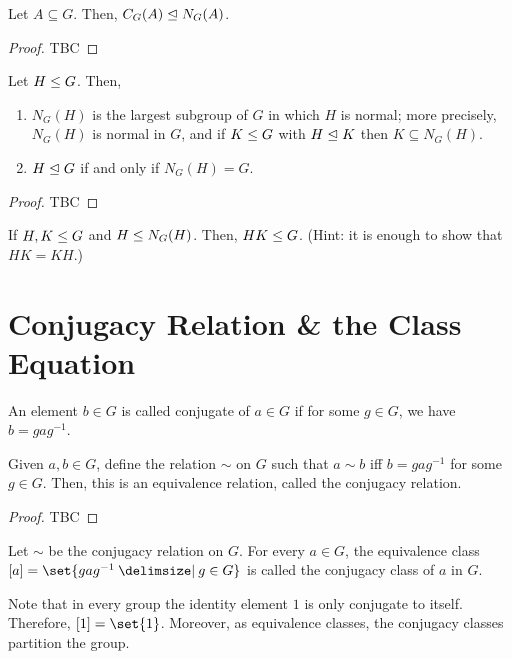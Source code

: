 \documentclass[11pt]{penrose}
\begin{document}
\begin{nprop}
    Let $A \subseteq G$. Then, $C_{G}(A) \mathrel{\trianglelefteq} N_{G}(A)$.
\end{nprop}
\begin{proof}
    TBC
\end{proof}

\begin{nprop}
    Let $H \mathrel{\leq} G$. Then,
    \begin{enumerate}
        \item $N_{G}(H)$ is the largest subgroup of $G$ in which $H$ is normal; more precisely, $N_{G}(H)$ is normal in $G$, and if $K \mathrel{\leq} G$ with $H \mathrel{\trianglelefteq} K$ then $K \subseteq N_{G}(H)$.
        \item $H \mathrel{\trianglelefteq} G$ if and only if $N_{G}(H) = G$.
    \end{enumerate}
\end{nprop}
\begin{proof}
    TBC
\end{proof}

\begin{nex}
    If $H, K \mathrel{\leq} G$ and $H \mathrel{\leq} N_{G}(H)$. Then, $HK \mathrel{\leq} G$. (Hint: it is enough to show that $HK = KH$.)
\end{nex}


\section{Conjugacy Relation \& the Class Equation}
\begin{ndfn}
    An element $b \in G$ is called conjugate of $a \in G$ if for some $g \in G$, we have $b = g a g^{-1}$.
\end{ndfn}

\begin{nthm}
    Given $a,b \in G$, define the relation $\sim$ on $G$ such that $a \sim b$ iff $b = g a g^{-1}$ for some $g \in G$. Then, this is an equivalence relation, called the conjugacy relation.
\end{nthm}
\begin{proof}
    TBC
\end{proof}

\begin{ndfn}
    Let $\sim$ be the conjugacy relation on $G$. For every $a \in G$, the equivalence class $[a] = \set{ g a g^{-1} \st g \in G }$ is called the conjugacy class of $a$ in $G$.
\end{ndfn}

Note that in every group the identity element $1$ is only conjugate to itself. Therefore, $[1] = \set{1}$. Moreover, as equivalence classes, the conjugacy classes partition the group.
\end{document}
